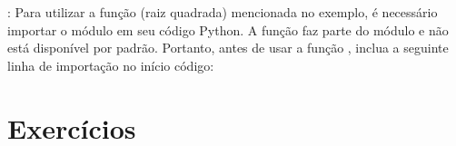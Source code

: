 \documentclass[letterpaper,10pt,english]{jupyterBook}
\begin{document}
\sphinxAtStartPar
{}: Para utilizar a função  (raiz quadrada) mencionada no exemplo, é necessário importar o módulo  em seu código Python. A função  faz parte do módulo  e não está disponível por padrão. Portanto, antes de usar a função , inclua a seguinte linha de importação no início código:

\begin{sphinxVerbatim}[commandchars=\\\{\}]
   
\end{sphinxVerbatim}


\section{Exercícios}
\end{document}
